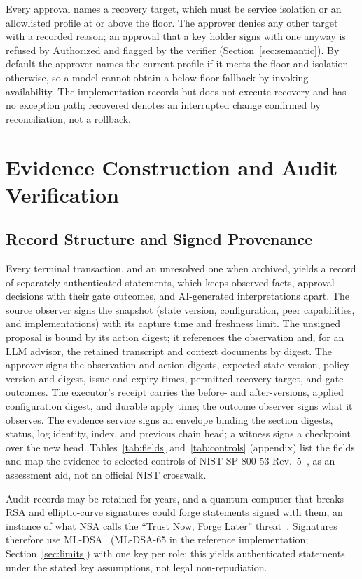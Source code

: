 \documentclass[journal]{IEEEtran}
\newcommand{\Authorized}{\mathrm{Authorized}}
\begin{document}
Every approval names a recovery target, which must be service isolation or an allowlisted profile at or above the floor. The approver denies any other target with a recorded reason; an approval that a key holder signs with one anyway is refused by $\Authorized$ and flagged by the verifier (Section~\ref{sec:semantic}). By default the approver names the current profile if it meets the floor and isolation otherwise, so a model cannot obtain a below-floor fallback by invoking availability. The implementation records but does not execute recovery and has no exception path; recovered denotes an interrupted change confirmed by reconciliation, not a rollback.

\section{Evidence Construction and Audit Verification}
\label{sec:evidence}

\subsection{Record Structure and Signed Provenance}
Every terminal transaction, and an unresolved one when archived, yields a record of separately authenticated statements, which keeps observed facts, approval decisions with their gate outcomes, and AI-generated interpretations apart. The source observer signs the snapshot (state version, configuration, peer capabilities, and implementations) with its capture time and freshness limit. The unsigned proposal is bound by its action digest; it references the observation and, for an LLM advisor, the retained transcript and context documents by digest. The approver signs the observation and action digests, expected state version, policy version and digest, issue and expiry times, permitted recovery target, and gate outcomes. The executor's receipt carries the before- and after-versions, applied configuration digest, and durable apply time; the outcome observer signs what it observes. The evidence service signs an envelope binding the section digests, status, log identity, index, and previous chain head; a witness signs a checkpoint over the new head. Tables~\ref{tab:fields} and~\ref{tab:controls} (appendix) list the fields and map the evidence to selected controls of NIST SP 800-53 Rev.~5~\cite{sp80053}, as an assessment aid, not an official NIST crosswalk.

Audit records may be retained for years, and a quantum computer that breaks RSA and elliptic-curve signatures could forge statements signed with them, an instance of what NSA calls the ``Trust Now, Forge Later'' threat~\cite{nsaarmor}. Signatures therefore use ML-DSA~\cite{fips204} (ML-DSA-65 in the reference implementation; Section~\ref{sec:limits}) with one key per role; this yields authenticated statements under the stated key assumptions, not legal non-repudiation.
\end{document}
